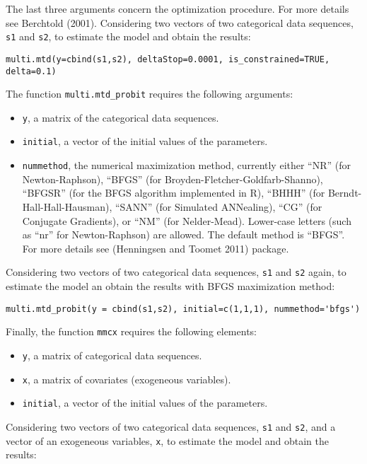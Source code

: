 The last three arguments concern the optimization procedure. For more details see Berchtold (2001). Considering two vectors of two categorical data sequences, \texttt{s1} and \texttt{s2}, to estimate the model and obtain the results:

\begin{verbatim}
multi.mtd(y=cbind(s1,s2), deltaStop=0.0001, is_constrained=TRUE, delta=0.1)
\end{verbatim}

The function \texttt{multi.mtd\_probit} requires the following arguments:

\begin{itemize}
\tightlist
\item
  \texttt{y}, a matrix of the categorical data sequences.
\item
  \texttt{initial}, a vector of the initial values of the parameters.
\item
  \texttt{nummethod}, the numerical maximization method, currently either ``NR'' (for Newton-Raphson), ``BFGS'' (for Broyden-Fletcher-Goldfarb-Shanno), ``BFGSR'' (for the BFGS algorithm implemented in R), ``BHHH'' (for Berndt-Hall-Hall-Hausman), ``SANN'' (for Simulated ANNealing), ``CG'' (for Conjugate Gradients), or ``NM'' (for Nelder-Mead). Lower-case letters (such as ``nr'' for Newton-Raphson) are allowed. The default method is ``BFGS''. For more details see  (Henningsen and Toomet 2011) package.
\end{itemize}

Considering two vectors of two categorical data sequences, \texttt{s1} and \texttt{s2} again, to estimate the model an obtain the results with BFGS maximization method:

\begin{verbatim}
multi.mtd_probit(y = cbind(s1,s2), initial=c(1,1,1), nummethod='bfgs')
\end{verbatim}

Finally, the function \texttt{mmcx} requires the following elements:

\begin{itemize}
\tightlist
\item
  \texttt{y}, a matrix of categorical data sequences.
\item
  \texttt{x}, a matrix of covariates (exogeneous variables).
\item
  \texttt{initial}, a vector of the initial values of the parameters.
\end{itemize}

Considering two vectors of two categorical data sequences, \texttt{s1} and \texttt{s2}, and a vector of an exogeneous variables, \texttt{x}, to estimate the model and obtain the results:

